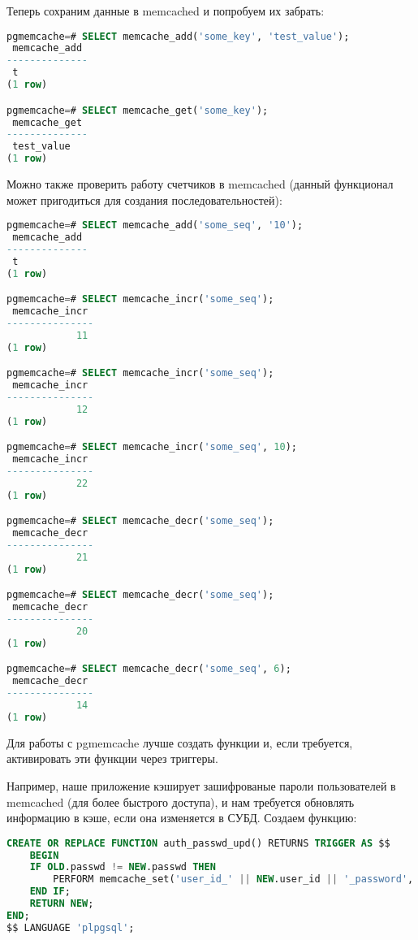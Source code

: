 Теперь сохраним данные в memcached и попробуем их забрать:

\begin{lstlisting}[language=SQL,label=lst:pgcache9,caption=Проверка]
pgmemcache=# SELECT memcache_add('some_key', 'test_value');
 memcache_add
--------------
 t
(1 row)

pgmemcache=# SELECT memcache_get('some_key');
 memcache_get
--------------
 test_value
(1 row)

\end{lstlisting}

Можно также проверить работу счетчиков в memcached (данный функционал может пригодиться для создания последовательностей):

\begin{lstlisting}[language=SQL,label=lst:pgcache10,caption=Проверка]
pgmemcache=# SELECT memcache_add('some_seq', '10');
 memcache_add
--------------
 t
(1 row)

pgmemcache=# SELECT memcache_incr('some_seq');
 memcache_incr
---------------
            11
(1 row)

pgmemcache=# SELECT memcache_incr('some_seq');
 memcache_incr
---------------
            12
(1 row)

pgmemcache=# SELECT memcache_incr('some_seq', 10);
 memcache_incr
---------------
            22
(1 row)

pgmemcache=# SELECT memcache_decr('some_seq');
 memcache_decr
---------------
            21
(1 row)

pgmemcache=# SELECT memcache_decr('some_seq');
 memcache_decr
---------------
            20
(1 row)

pgmemcache=# SELECT memcache_decr('some_seq', 6);
 memcache_decr
---------------
            14
(1 row)

\end{lstlisting}

Для работы с pgmemcache лучше создать функции и, если требуется, активировать эти функции через триггеры.

Например, наше приложение кэширует зашифрованые пароли пользователей в memcached (для более быстрого доступа), и нам требуется обновлять информацию в кэше, если она изменяется в СУБД. Создаем функцию:

\begin{lstlisting}[language=SQL,label=lst:pgcache11,caption=Функция для обновления данных в кэше]
CREATE OR REPLACE FUNCTION auth_passwd_upd() RETURNS TRIGGER AS $$
	BEGIN
	IF OLD.passwd != NEW.passwd THEN
		PERFORM memcache_set('user_id_' || NEW.user_id || '_password', NEW.passwd);
	END IF;
	RETURN NEW;
END;
$$ LANGUAGE 'plpgsql';
\end{lstlisting}

